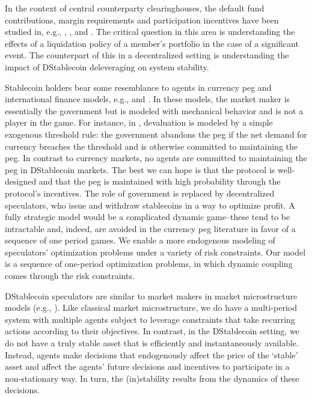 In the context of central counterparty clearinghouses, the default fund contributions, margin requirements and participation incentives have been studied in, e.g., \cite{capponi2017}, \cite{amini2015}, and \cite{duffie2015}. The critical question in this area is understanding the effects of a liquidation policy of a member's portfolio in the case of a significant event. The counterpart of this in a decentralized setting is understanding the impact of DStablecoin deleveraging on system stability.


Stablecoin holders bear some resemblance to agents in currency peg and international finance models, e.g., \cite{morris1998} and \cite{guimaraes2007}. In these models, the market maker is essentially the government but is modeled with mechanical behavior and is not a player in the game. For instance, in \cite{guimaraes2007}, devaluation is modeled by a simple exogenous threshold rule: the government abandons the peg if the net demand for currency breaches the threshold and is otherwise committed to maintaining the peg. In contrast to currency markets, no agents are committed to maintaining the peg in DStablecoin markets. The best we can hope is that the protocol is well-designed and that the peg is maintained with high probability through the protocol's incentives. The role of government is replaced by decentralized speculators, who issue and withdraw stablecoins in a way to optimize profit. A fully strategic model would be a complicated dynamic game--these tend to be intractable and, indeed, are avoided in the currency peg literature in favor of a sequence of one period games. We enable a more endogenous modeling of speculators' optimization problems under a variety of risk constraints. Our model is a sequence of one-period optimization problems, in which dynamic coupling comes through the risk constraints.

DStablecoin speculators are similar to market makers in market microstructure models (e.g., \cite{ohara1997}). Like classical market microstructure, we do have a multi-period system with multiple agents subject to leverage constraints that take recurring actions according to their objectives. In contrast, in the DStablecoin setting, we do not have a truly stable asset that is efficiently and instantaneously available. Instead, agents make decisions that endogenously affect the price of the `stable' asset and affect the agents' future decisions and incentives to participate in a non-stationary way. In turn, the (in)stability results from the dynamics of these decisions.

